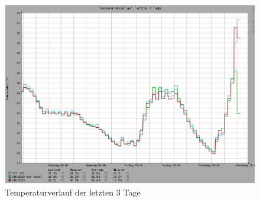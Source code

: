 \begin{figure}[!h] 
  \centering
     \includegraphics[scale=.72]{BilderAllgemein/Bilder/Temperatur3Tage.png}
  \caption{Temperaturverlauf der letzten 3 Tage}
\end{figure}
